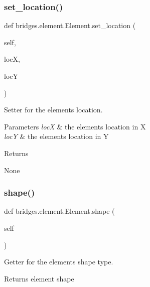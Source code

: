 \subsubsection{\texorpdfstring{set\+\_\+location()}{set\_location()}}
{\footnotesize\ttfamily def bridges.\+element.\+Element.\+set\+\_\+location (\begin{DoxyParamCaption}\item[{}]{self,  }\item[{}]{locX,  }\item[{}]{locY }\end{DoxyParamCaption})}



Setter for the element\textquotesingle{}s location. 


\begin{DoxyParams}{Parameters}
{\em locX} & the element\textquotesingle{}s location in X \\
\hline
{\em locY} & the element\textquotesingle{}s location in Y \\
\hline
\end{DoxyParams}
\begin{DoxyReturn}{Returns}


None 
\end{DoxyReturn}
\mbox{\label{classbridges_1_1element_1_1_element_a4485e4854639bcb163a36d0629f0e8f9}} 
\subsubsection{\texorpdfstring{shape()}{shape()}\hspace{0.1cm}{\footnotesize\ttfamily [1/2]}}
{\footnotesize\ttfamily def bridges.\+element.\+Element.\+shape (\begin{DoxyParamCaption}\item[{}]{self }\end{DoxyParamCaption})}



Getter for the element\textquotesingle{}s shape type. 

\begin{DoxyReturn}{Returns}
element shape 
\end{DoxyReturn}
\mbox{\label{classbridges_1_1element_1_1_element_a54d45aa4c09c0b5745cebbabcc0c02f9}} 
